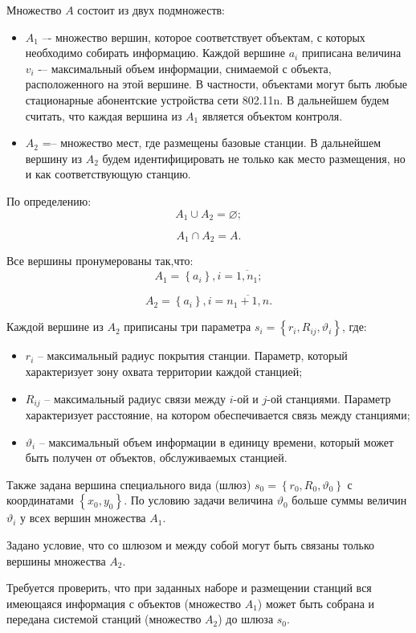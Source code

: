Множество $A$ состоит из двух подмножеств:
\begin{itemize}
    \item $A_1$ –- множество вершин, которое соответствует объектам, с которых необходимо собирать информацию. Каждой вершине $a_i$ приписана величина $v_i$ -– максимальный объем информации, снимаемой с объекта, расположенного на этой вершине. В частности, объектами могут быть любые стационарные абонентские устройства сети 802.11n. В дальнейшем будем считать, что каждая вершина из $A_1$ является объектом контроля.
    \item $A_2$ =– множество мест, где размещены базовые станции. В дальнейшем вершину из $A_2$ будем идентифицировать  не только как место размещения, но и как соответствующую станцию.
\end{itemize}

По определению:
$$
A_1 \cup A_2 = \varnothing;
$$

$$
A_1 \cap A_2 = A.
$$

Все вершины пронумерованы так,что:
$$
A_1 = \left\{a_i \right\}, i= \overline{1,n_1};
$$

$$
A_2 = \left\{ a_i  \right\}, i= \overline{n_1+1,n}.
$$

Каждой вершине из $A_2$ приписаны три параметра $s_i = \left\{ r_i, R_{ij},\vartheta_i \right\} $, где:

\begin{itemize}
    \item $r_i$ -- максимальный радиус покрытия станции. Параметр, который характеризует зону охвата территории каждой станцией;
    \item $R_{ij}$ -- максимальный радиус связи между $i$-ой и $j$-ой станциями. Параметр характеризует расстояние, на котором обеспечивается связь между станциями;
    \item $\vartheta_i$ -- максимальный объем информации в единицу времени, который может быть получен от объектов, обслуживаемых станцией.
\end{itemize}

Также задана вершина специального вида (шлюз) $s_0 = \left\{ r_0, R_0, \vartheta_0 \right\} $ с координатами $\left\{x_0, y_0 \right\}$. По условию задачи величина $\vartheta_0$ больше суммы величин $\vartheta_i$ у всех вершин множества $A_1$.

Задано условие, что со шлюзом и между собой могут быть связаны только вершины множества $A_2$.

Требуется проверить, что при заданных наборе и размещении станций вся имеющаяся информация с объектов (множество $A_1$) может быть собрана и передана системой станций (множество $A_2$) до шлюза $s_0$.

